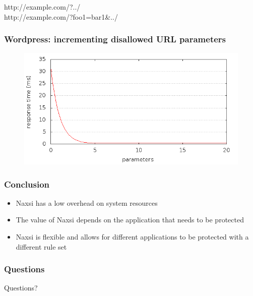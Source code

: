 \begin{frame}
  \mbox{http://example.com/?../}\\
  \mbox{http://example.com/?foo1=bar1\&../}
  
  \frametitle{Wordpress: incrementing disallowed URL parameters}
  \begin{figure}[H]
  \centering
  \includegraphics[scale=0.5] {../paper/images/results/wp_with_naxsi_incremented_disallowed_parameters/output.png}
  \end{figure}
\end{frame}   

\begin{frame}
  \frametitle{Conclusion}
  \begin{itemize}
    \item Naxsi has a low overhead on system resources
    \item The value of Naxsi depends on the application that needs to be protected
    \item Naxsi is flexible and allows for different applications to be protected with a different rule set
  \end{itemize}
\end{frame}

\begin{frame}
  \frametitle{Questions}
  \begin{center}
  Questions?
  \end{center}
\end{frame}
